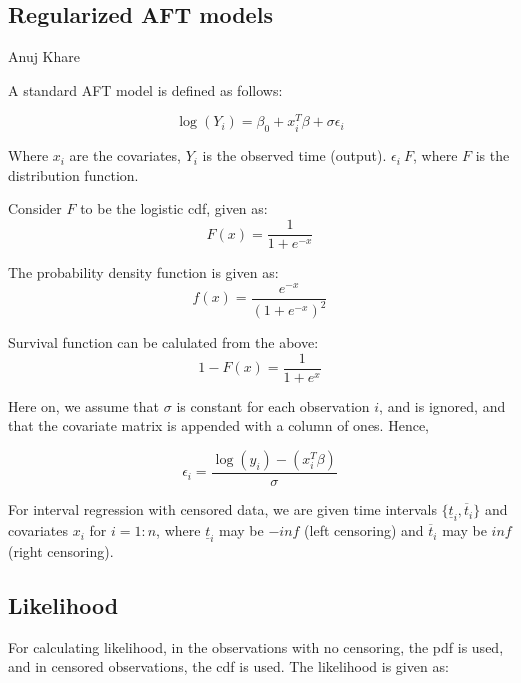 \documentclass[12pt,a4paper]{report}
\begin{document}
\begin{center} \section*{Regularized AFT models} Anuj Khare \end{center}
\vspace{8mm}
A standard AFT model is defined as follows:


\begin{equation}
	\log (Y_i) = \beta_0  + x_i^T \beta + \sigma \epsilon_i
\end{equation}

Where $x_i$ are the covariates, $Y_i$ is the observed time (output). $\epsilon_i ~ F$, where $F$ is the distribution function.

Consider $F$ to be the logistic cdf, given as:
\begin{equation} \label{cdf}
F(x) = \frac{1}{1 + e^{-x}}
\end{equation}

The probability density function is given as:
\begin{equation} \label{pdf}
f(x) = \frac{e^{-x}}{(1 + e^{-x})^2}
\end{equation}

Survival function can be calulated from the above:
\begin{equation} \label{survival}
1 - F(x) = \frac{1}{1 + e^{x}}
\end{equation}

Here on, we assume that $\sigma$ is constant for each observation $i$, and is ignored, and that the covariate matrix is appended with a column of ones.
Hence,

\begin{equation}
	\epsilon_i = \frac{\log (y_i) - (x_i^T \beta)} {\sigma}
\end{equation}


For interval regression with censored data, we are given time intervals $\{\underline t_i, \overline t_i\}$ and covariates $x_i$ for $i=1:n$, where $\underline t_i$ may be $-inf$
(left censoring) and $\overline t_i$ may be $inf$ (right censoring).

\subsection*{Likelihood}
For calculating likelihood, in the observations with no censoring, the pdf is used, and in censored observations, the cdf is used.
The likelihood is given as:
\end{document}
